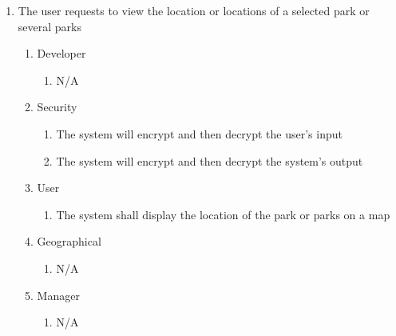\documentclass[titlepage]{article}
\begin{document}
\begin{enumerate}[{BE}1.]
    \item The user requests to view the location or locations of a selected park or several parks
    \begin{enumerate}[{VP\theenumi}.1]
        \item Developer
            \begin{enumerate}
                \item N/A
            \end{enumerate}
        \item Security
            \begin{enumerate}
                \item The system will encrypt and then decrypt the user's input
                \item The system will encrypt and then decrypt the system's output
            \end{enumerate}
        \item User
            \begin{enumerate}
                \item The system shall display the location of the park or parks on a map
            \end{enumerate}
        \item Geographical
            \begin{enumerate}
                \item N/A
            \end{enumerate}
        \item Manager
            \begin{enumerate}
                \item N/A
            \end{enumerate}
    \end{enumerate}


\end{enumerate}
\end{document}
